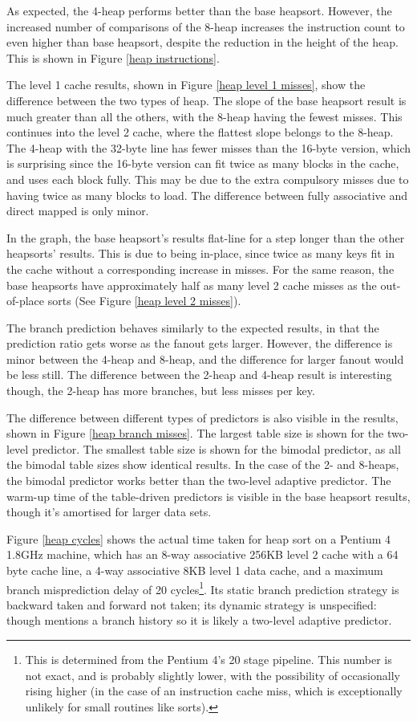 As expected, the 4-heap performs better than the base heapsort. However, the
increased number of comparisons of the 8-heap increases the instruction count to
even higher than base heapsort, despite the reduction in the height of the heap.
This is shown in Figure \ref{heap instructions}.

The level 1 cache results, shown in Figure \ref{heap level 1 misses}, show the
difference between the two types of heap. The slope of the base heapsort result
is much greater than all the others, with the 8-heap having the fewest misses.
This continues into the level 2 cache, where the flattest slope belongs to the
8-heap. The 4-heap with the 32-byte line has fewer misses than the 16-byte
version, which is surprising since the 16-byte version can fit twice as many
blocks in the cache, and uses each block fully.  This may be due to the extra
compulsory misses due to having twice as many blocks to load. The difference
between fully associative and direct mapped is only minor.

In the graph, the base heapsort's results flat-line for a step longer than the
other heapsorts' results. This is due to being in-place, since twice as many
keys fit in the cache without a corresponding increase in misses. For the same
reason, the base heapsorts have approximately half as many level 2 cache misses
as the out-of-place sorts (See Figure \ref{heap level 2 misses}).

The branch prediction behaves similarly to the expected results, in that the
prediction ratio gets worse as the fanout gets larger. However, the difference
is minor between the 4-heap and 8-heap, and the difference for larger fanout
would be less still. The difference between the 2-heap and 4-heap result is
interesting though, the 2-heap has more branches, but less misses per key.

The difference between different types of predictors is also visible in the
results, shown in Figure \ref{heap branch misses}. The largest table size is
shown for the two-level predictor. The smallest table size is shown for the
bimodal predictor, as all the bimodal table sizes show identical results.  In
the case of the 2- and 8-heaps, the bimodal predictor works better than the
two-level adaptive predictor. The warm-up time of the table-driven predictors is
visible in the base heapsort results, though it's amortised for larger data
sets.

Figure \ref{heap cycles} shows the actual time taken for heap sort on a Pentium
4 1.8GHz machine, which has an 8-way associative 256KB level 2 cache with a 64 byte
cache line, a 4-way associative 8KB level 1 data cache, and a maximum branch
misprediction delay of 20 cycles\footnote{This is determined from the Pentium
4's 20 stage pipeline. This number is not exact, and is probably slightly lower,
with the possibility of occasionally rising higher (in the case of an
instruction cache miss, which is exceptionally unlikely for small routines like
sorts).}. Its static branch prediction strategy is backward taken and forward
not taken; its dynamic strategy is unspecified: though \cite{Intel248966-010}
mentions a branch history so it is likely a two-level adaptive predictor.

